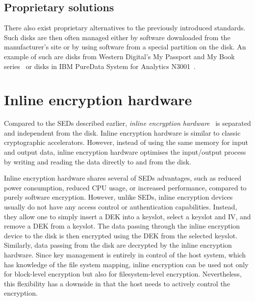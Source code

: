 
\subsection{Proprietary solutions}

There also exist proprietary alternatives to the previously introduced standards. Such disks are then often managed either by software downloaded from the manufacturer's site or by using software from a special partition on the disk.
An example of such are disks from Western Digital's My Passport and My Book series~\cite{got_hw_crypto} or disks in IBM PureData System for Analytics N3001~\cite{ibm_sed}.





\section{Inline encryption hardware}

Compared to the SEDs described earlier, \emph{inline encryption hardware}~\cite{linux-doc-inline} is separated and independent from the disk. Inline encryption hardware is similar to classic cryptographic accelerators. However, instead of using the same memory for input and output data, inline encryption hardware optimises the input/output process by writing and reading the data directly to and from the disk.

Inline encryption hardware shares several of SEDs advantages, such as reduced power consumption, reduced CPU usage, or increased performance, compared to purely software encryption.
However, unlike SEDs, inline encryption devices usually do not have any access control or authentication capabilities. Instead, they allow one to simply insert a DEK into a keyslot, select a keyslot and IV, and remove a DEK from a keyslot. The data passing through the inline encryption device to the disk is then encrypted using the DEK from the selected keyslot. Similarly, data passing from the disk are decrypted by the inline encryption hardware.
Since key management is entirely in control of the host system, which has knowledge of the file system mapping, inline encryption can be used not only for block-level encryption but also for filesystem-level encryption. Nevertheless, this flexibility has a downside in that the host needs to actively control the encryption.

